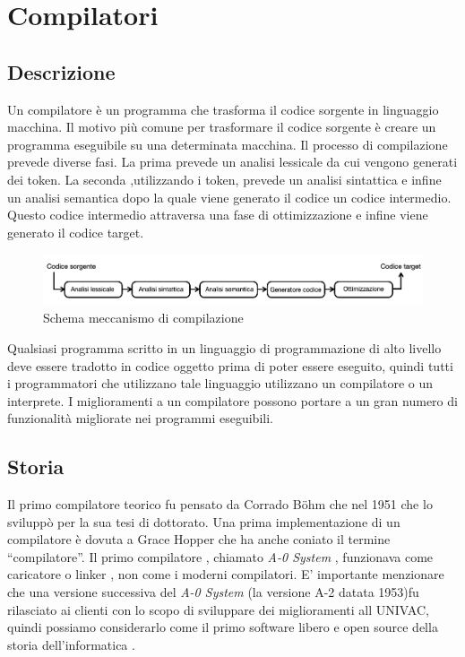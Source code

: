 \documentclass[12pt,a4paper]{report}
\begin{document}
\chapter{Compilatori}

\section{Descrizione}
Un compilatore è un programma che trasforma il codice sorgente in linguaggio macchina. Il motivo più comune per trasformare il codice sorgente è creare un programma eseguibile su una determinata macchina. Il processo di compilazione prevede diverse fasi. La prima prevede un analisi lessicale da cui vengono generati dei token. La seconda ,utilizzando i token, prevede un analisi sintattica e infine un analisi semantica dopo la quale viene generato il codice un codice intermedio. Questo codice intermedio attraversa una fase di ottimizzazione e infine viene generato il codice target.


\begin{figure}
\centering
\includegraphics[width = \textwidth]{SchemaCompilatore.png}
\caption{Schema meccanismo di compilazione}
\label{Fig:MeccanismoCompilazione}
\end{figure} %

Qualsiasi programma scritto in un linguaggio di programmazione di alto livello deve essere tradotto in codice oggetto prima di poter essere eseguito, quindi tutti i programmatori che utilizzano tale linguaggio utilizzano un compilatore o un interprete. I miglioramenti a un compilatore possono portare a un gran numero di funzionalità migliorate nei programmi eseguibili.

\section{Storia}
Il primo compilatore teorico fu pensato da Corrado Böhm che nel 1951 che lo sviluppò per la sua tesi di dottorato.  Una  prima implementazione di un compilatore è dovuta a Grace Hopper  che ha anche coniato il termine ``compilatore''.  Il primo compilatore , chiamato \textit{A-0 System} ,  funzionava come caricatore o linker , non come i moderni compilatori. E' importante menzionare che una versione successiva del \textit{A-0 System} (la versione A-2 datata 1953)fu rilasciato ai clienti con lo scopo di sviluppare dei miglioramenti all UNIVAC, quindi possiamo considerarlo come il primo software libero e open source della storia dell'informatica \cite{SystemA0}.
\end{document}
